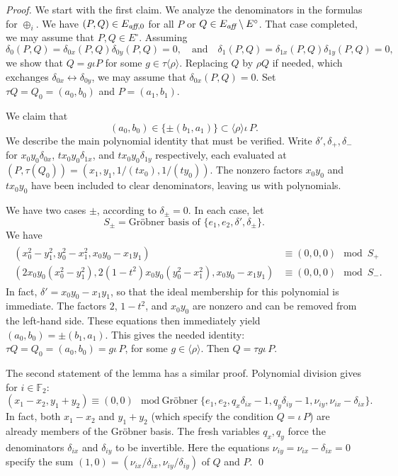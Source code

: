 \documentclass{llncs}
\newcommand{\ring}[1]{\mathbb{#1}}
\newcommand{\op}[1]{\hbox{#1}}
\newcommand{\Eaff}{E_{\op{\scriptsize\it aff}}}
\newcommand{\Eaf}[1]{E_{\op{\scriptsize\it aff},{#1}}}
\newcommand{\Eoo}{E^{\circ}} %
\newcommand{\Go}{\langle\rho\rangle}
\newcommand{\ang}[1]{\langle{#1}\rangle}
\begin{document}
\begin{proof}  
We start with the first claim.
We analyze the denominators in the formulas for $\oplus_i$.  
We have $(P,Q)\in\Eaf{0}$ for all $P$ or $Q\in \Eaff\setminus\Eoo$.
That case completed,  we may assume that $P,Q\in \Eoo$.
  Assuming
  \[
  \delta_0(P,Q) = \delta_{0x}(P,Q)\delta_{0y}(P,Q)=0,\quad\text{and}\quad
  \delta_1(P,Q) = \delta_{1x}(P,Q)\delta_{1y}(P,Q)=0,
  \]
  we show that $Q = g \iota P$ for some $g\in \tau\ang{\rho}$.
  Replacing $Q$ by $\rho Q$ if needed, which exchanges
  $\delta_{0x}\leftrightarrow \delta_{0y}$, we may assume that
  $\delta_{0x}(P,Q)=0$.  Set $\tau Q = Q_0 = (a_0,b_0)$ and
  $P=(a_1,b_1)$.  

We claim that
\begin{equation}\label{eqn:gp-}
(a_0,b_0) \in \{\pm (b_1,a_1)\} \subset \Go\iota\,P.
\end{equation}
We describe
the main polynomial identity that must be verified.
Write $\delta',\delta_{+},\delta_{-}$ for $x_0 y_0\delta_{0x}$, $t x_0
y_0\delta_{1x}$, and $t x_0 y_0 \delta_{1y}$ respectively, each
evaluated at $(P,\tau(Q_0))=(x_1,y_1,1/(t x_0),1/(t y_0))$.  The
nonzero factors $x_0y_0$ and $t x_0 y_0$ have been included to clear
denominators, leaving us with polynomials.

We have two cases $\pm$, according to $\delta_{\pm}=0$.  In each case,
let
\[
S_\pm = \text{Gr\"obner basis of } \{e_1,e_2, 
\delta',\delta_{\pm} %
\}.
\]
We have
\begin{align}\label{eqn:dichot}
\begin{split}
(x_0^2-y_1^2, %
 y_0^2-x_1^2, %
 x_0 y_0 - x_1 y_1 %
) &\equiv (0,0,0) \mod S_+\\
(2 x_0 y_0 (x_0^2-y_1^2), %
2 (1-t^2) x_0 y_0 (y_0^2-x_1^2), %
x_0 y_0 - x_1 y_1 %
) &\equiv (0,0,0) \mod S_-.
\end{split}
\end{align}
In fact, $\delta' = x_0 y_0-x_1 y_1$, so that the ideal membership for
this polynomial is immediate.  The factors $2$, $1-t^2$, and $x_0 y_0$
are nonzero and can be removed from the left-hand side.
These equations then immediately yield $(a_0,b_0) = \pm (b_1,a_1)$.  
This gives the needed identity:  $\tau Q =
Q_0 = (a_0,b_0) = g \iota\,P$, for some $g\in \Go$.  Then $Q = \tau g
\iota\,P$.

The second statement of the lemma has a similar proof.  Polynomial
division gives for $i\in \ring{F}_2$:
\[
(x_1-x_2,y_1+y_2)\equiv (0,0) \mod \text{Gr\"obner} 
\{ e_1,e_2,q_x \delta_{ix}-1,q_y \delta_{iy}-1,
\nu_{i y},\nu_{i x}-\delta_{i x} \}.
\]
In fact, both $x_1-x_2$ and $y_1+y_2$ (which specify the condition $Q
=\iota\,P$) are already members of the Gr\"obner basis.  The fresh
variables $q_x,q_y$ force the denominators $\delta_{ix}$ and
$\delta_{iy}$ to be invertible.  Here the equations $\nu_{i y}=\nu_{i
  x}-\delta_{i x}=0$ specify the sum
$(1,0)=(\nu_{ix}/\delta_{ix},\nu_{iy}/\delta_{iy})$ of $Q$ and $P$.
\qed\end{proof}
\end{document}
